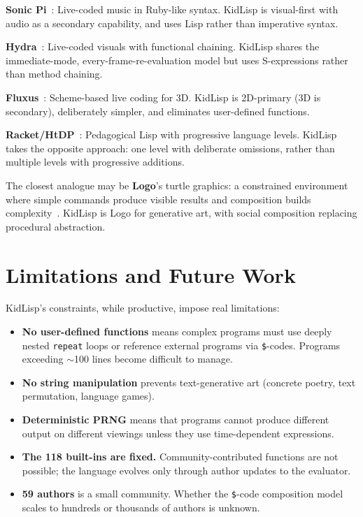 \documentclass[sigconf,nonacm]{acmart}
\begin{document}
\textbf{Sonic Pi}~\cite{aaron2016sonic}: Live-coded music in Ruby-like syntax. KidLisp is visual-first with audio as a secondary capability, and uses Lisp rather than imperative syntax.

\textbf{Hydra}~\cite{jack2019hydra}: Live-coded visuals with functional chaining. KidLisp shares the immediate-mode, every-frame-re-evaluation model but uses S-expressions rather than method chaining.

\textbf{Fluxus}~\cite{griffiths2007fluxus}: Scheme-based live coding for 3D. KidLisp is 2D-primary (3D is secondary), deliberately simpler, and eliminates user-defined functions.

\textbf{Racket/HtDP}~\cite{felleisen2018htdp}: Pedagogical Lisp with progressive language levels. KidLisp takes the opposite approach: one level with deliberate omissions, rather than multiple levels with progressive additions.

The closest analogue may be \textbf{Logo}'s turtle graphics: a constrained environment where simple commands produce visible results and composition builds complexity~\cite{papert1980mindstorms}. KidLisp is Logo for generative art, with social composition replacing procedural abstraction.

\section{Limitations and Future Work}

KidLisp's constraints, while productive, impose real limitations:

\begin{itemize}
  \item \textbf{No user-defined functions} means complex programs must use deeply nested \texttt{repeat} loops or reference external programs via \texttt{\$}-codes. Programs exceeding $\sim$100 lines become difficult to manage.
  \item \textbf{No string manipulation} prevents text-generative art (concrete poetry, text permutation, language games).
  \item \textbf{Deterministic PRNG} means that programs cannot produce different output on different viewings unless they use time-dependent expressions.
  \item \textbf{The 118 built-ins are fixed.} Community-contributed functions are not possible; the language evolves only through author updates to the evaluator.
  \item \textbf{59 authors} is a small community. Whether the \texttt{\$}-code composition model scales to hundreds or thousands of authors is unknown.
\end{itemize}
\end{document}

